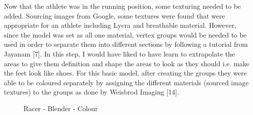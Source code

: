 \documentclass[a4 paper, 12pt]{article}
\begin{document}
Now that the athlete was in the running position, some texturing needed to be added. Sourcing images from Google, some textures were found that were appropriate for an athlete including Lycra and breathable material. However, since the model was set as all one material, vertex groups would be needed to be used in order to separate them into different sections by following a tutorial from Jayanam [7]. In this step, I would have liked to have learn to extrapolate the areas to give them definition and shape the areas to look as they should i.e. make the feet look like shoes. For this basic model, after creating the groups  they were able to be coloured separately by assigning the different materials (sourced image textures) to the groups as done by Weisbrod Imaging [14].
    \begin{figure} [H]
        \caption{Racer - Blender - Colour}   
    \end{figure}
\end{document}
